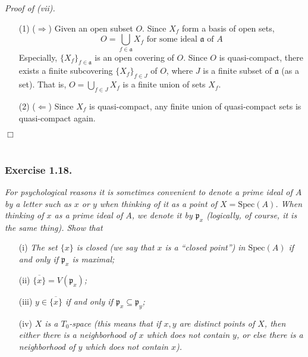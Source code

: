 \documentclass{article}
\begin{document}
\emph{Proof of (vii).}
\begin{enumerate}
\item[(1)]
($\Longrightarrow$)
Given an open subset $O$.
Since $X_f$ form a basis of open sets,
$$O = \bigcup_{f \in \mathfrak{a}} X_f \text{ for some ideal $\mathfrak{a}$ of $A$}$$
Especially, $\{X_f\}_{f \in \mathfrak{a}}$ is an open covering of $O$.
Since $O$ is quasi-compact, there exists a finite subcovering $\{X_f\}_{f \in J}$ of $O$,
where $J$ is a finite subset of $\mathfrak{a}$ (as a set).
That is,
$O = \bigcup_{f \in J} X_f$ is a finite union of sets $X_f$.
\item[(2)]
($\Longleftarrow$)
Since $X_f$ is quasi-compact, any finite union of quasi-compact sets is quasi-compact again.
\end{enumerate}
$\Box$ \\\\






\subsubsection*{Exercise 1.18.}
\emph{For psychological reasons it is sometimes convenient to denote a prime ideal of $A$ by
a letter such as $x$ or $y$ when thinking of it as a point of $X = \mathrm{Spec}(A)$.
When thinking of $x$ as a prime ideal of $A$, we denote it by $\mathfrak{p}_x$
(logically, of course, it is the same thing).
Show that}
\begin{enumerate}
\item[(i)]
  \emph{The set $\{x\}$ is closed
  (we say that $x$ is a ``closed point'') in $\mathrm{Spec}(A)$ if and only if $\mathfrak{p}_x$ is maximal;}

\item[(ii)]
  \emph{$\overline{\{x\}} = V(\mathfrak{p}_x)$;}

\item[(iii)]
  \emph{$y \in \overline{\{x\}}$ if and only if $\mathfrak{p}_x \subseteq \mathfrak{p}_y$;}

\item[(iv)]
  \emph{$X$ is a $T_0$-space
  (this means that if $x, y$ are distinct points of $X$,
  then either there is a neighborhood of $x$ which does not contain $y$,
  or else there is a neighborhood of $y$ which does not contain $x$).} \\
\end{enumerate}
\end{document}

